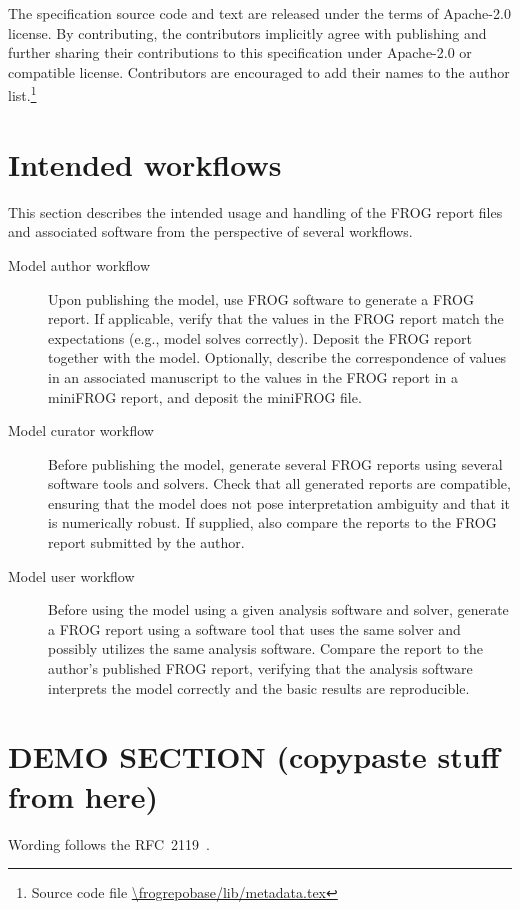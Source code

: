The specification source code and text are released under the terms of Apache-2.0 license. By contributing, the contributors implicitly agree with publishing and further sharing their contributions to this specification under Apache-2.0 or compatible license. Contributors are encouraged to add their names to the author list.\footnote{Source code file \url{\frogrepobase/lib/metadata.tex}}

\section{Intended workflows}

This section describes the intended usage and handling of the FROG report files and associated software from the perspective of several workflows.

\begin{description}
\item[Model author workflow] Upon publishing the model, use FROG software to generate a FROG report. If applicable, verify that the values in the FROG report match the expectations (e.g., model solves correctly). Deposit the FROG report together with the model. Optionally, describe the correspondence of values in an associated manuscript to the values in the FROG report in a miniFROG report, and deposit the miniFROG file.
\item[Model curator workflow] Before publishing the model, generate several FROG reports using several software tools and solvers. Check that all generated reports are compatible, ensuring that the model does not pose interpretation ambiguity and that it is numerically robust. If supplied, also compare the reports to the FROG report submitted by the author.
\item[Model user workflow] Before using the model using a given analysis software and solver, generate a FROG report using a software tool that uses the same solver and possibly utilizes the same analysis software. Compare the report to the author's published FROG report, verifying that the analysis software interprets the model correctly and the basic results are reproducible.
\end{description}

\iffalse
\section{DEMO SECTION (copypaste stuff from here)}

Wording follows the RFC~2119~\cite{rfc2119}.

